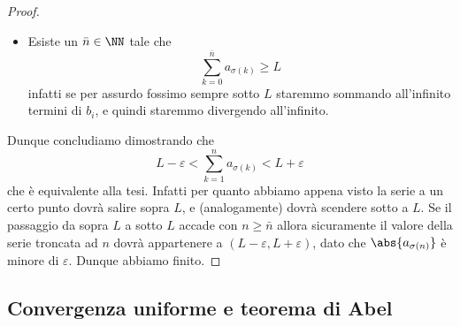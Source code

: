 \documentclass[11pt]{scrartcl}
\begin{document}
\begin{proof}
\begin{itemize}
  		\item Esiste un $\bar{n}\in \NN$ tale che 
  		$$\sum_{k=0}^{\bar{n}}a_{\sigma(k)}\ge L$$
  		infatti se per assurdo fossimo sempre sotto $L$ staremmo sommando all'infinito termini di $b_i$, e quindi staremmo divergendo all'infinito.
  	\end{itemize} 
  	Dunque concludiamo dimostrando che
  	$$L-\varepsilon<\sum_{k=1}^na_{\sigma(k)}<L+\varepsilon$$
  	che è equivalente alla tesi. Infatti per quanto abbiamo appena visto la serie a un certo punto dovrà salire sopra $L$, e (analogamente) dovrà scendere sotto a $L$. Se il passaggio da sopra $L$ a sotto $L$ accade con $n\ge \bar{n}$ allora sicuramente il valore della serie troncata ad $n$ dovrà appartenere a $(L-\varepsilon,L+\varepsilon)$, dato che $\abs{a_{\sigma(n)}}$ è minore di $\varepsilon$. Dunque abbiamo finito.
  \end{proof}
  
  \subsection{Convergenza uniforme e teorema di Abel}
  
\end{document}
